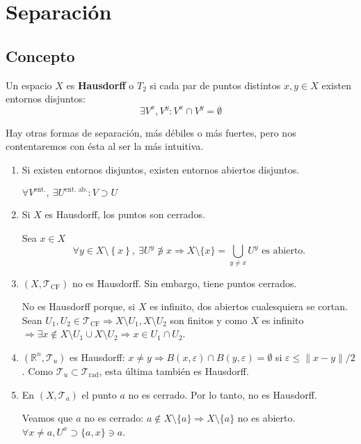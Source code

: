 \chapter{Separación}%
\label{cha:separacion}

\section{Concepto}%
\label{sec:concepto}
\begin{defi}
Un espacio $X$ es \textbf{Hausdorff} o $T_2$ si cada par de puntos distintos $x, y \in X$ existen entornos disjuntos:
\[
\exists V^x, V^y: V^x \cap V^y = \emptyset
\]
\end{defi}
Hay otras formas de separación, más débiles o más fuertes, pero nos contentaremos con ésta al ser la más intuitiva.

\begin{obs}
\begin{enumerate}
    \item Si existen entornos disjuntos, existen entornos abiertos disjuntos.
    \begin{demo}
        $\forall V^{\text{ent.}},\ \exists U^{\text{ent. ab.}}: V \supset U$
    \end{demo}
    \item Si $X$ es Hausdorff, los puntos son cerrados.
    \begin{demo}    
    Sea $x \in X$
    \[
    \forall y \in X \setminus \left\{ x \right\},\ \exists U^y \not\ni x \Rightarrow X \setminus \{x\} = \bigcup_{y \neq x} U^y  \text{ es abierto.} 
    \]
    \end{demo}
    \item $\left( X, \mathcal{T}_{\text{CF}} \right)$ no es Hausdorff. Sin embargo, tiene puntos cerrados.
    \begin{demo}
        No es Hausdorff porque, si $X$ es infinito, dos abiertos cualesquiera se cortan.
        Sean $U_1, U_2 \in \mathcal{T}_{\text{CF}} \Rightarrow X \setminus U_1, X \setminus U_2$ son finitos y como $X$ es infinito $\Rightarrow \exists x \not\in X \setminus U_1 \cup X \setminus U_2 \Rightarrow x \in U_1 \cap U_2$.
    \end{demo}

    \item $\left( \mathbb{R}^n, \mathcal{T}_{u} \right)$ es Hausdorff: $x \neq y \Rightarrow B\left( x, \varepsilon \right) \cap B\left( y, \varepsilon \right) = \emptyset$ si $\varepsilon \le \lVert x - y \rVert / 2$. Como $\mathcal{T}_{u} \subset \mathcal{T}_{\text{rad}}$, esta última también es Hausdorff.

    \item En $\left( X, \mathcal{T}_a \right)$ el punto $a$ no es cerrado. Por lo tanto, no es Hausdorff. 
    \begin{demo}
    Veamos que $a$ no es cerrado: $a \not\in X \setminus \{a\} \Rightarrow X \setminus \{a\}$ no es abierto. $\forall x \neq a, U^x \supset \{a, x\} \ni a$.   
    \end{demo}
\end{enumerate}
\end{obs}

